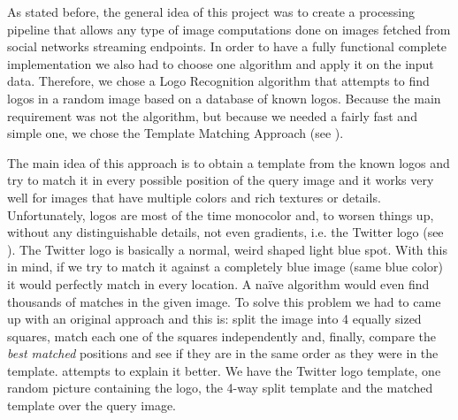 As stated before, the general idea of this project was to create a processing
pipeline that allows any type of image computations done on images fetched
from social networks streaming endpoints. In order to have a fully functional
complete implementation we also had to choose one algorithm and apply it on
the input data. Therefore, we chose a Logo Recognition algorithm that attempts
to find logos in a random image based on a database of known logos. Because
the main requirement was not the algorithm, but because we needed a fairly
fast and simple one, we chose the Template Matching Approach (see
).

The main idea of this approach is to obtain a template from the known logos
and try to match it in every possible position of the query image and it works
very well for images that have multiple colors and rich textures or details.
Unfortunately, logos are most of the time monocolor and, to worsen things up,
without any distinguishable details, not even gradients, i.e. the Twitter
logo (see ). The Twitter logo is basically
a normal, weird shaped light blue spot. With this in mind, if we try to match
it against a completely blue image (same blue color) it would perfectly match
in every location. A na{\"i}ve algorithm would even find thousands of matches
in the given image. To solve this problem we had to came up with an original
approach and this is: split the image into 4 equally sized squares, match
each one of the squares independently and, finally, compare the \textit{best
matched} positions and see if they are in the same order as they were in the
template.  attempts to explain it better.
We have the Twitter logo template, one random picture containing the logo,
the 4-way split template and the matched template over the query image.

